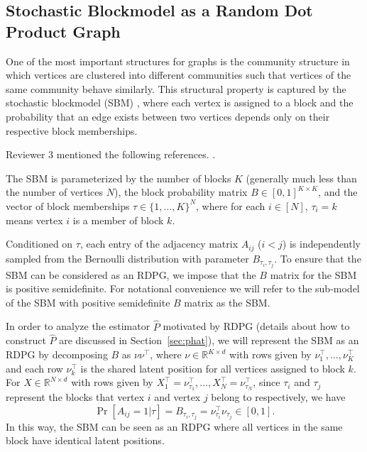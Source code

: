 \documentclass[10pt,letterpaper]{article}
\renewcommand{\Re}{\mathbb{R}}
\renewcommand{\hat}{\widehat}
\begin{document}
\subsection{Stochastic Blockmodel as a Random Dot Product Graph}
\label{section:sbm_rdpg}
One of the most important structures for graphs is the community structure in which vertices are clustered into different communities such that vertices of the same community behave similarly. This structural property is captured by the stochastic blockmodel (SBM) \citep{holland1983stochastic}, where each vertex is assigned to a block and the probability that an edge exists between two vertices depends only on their respective block memberships.

Reviewer 3 mentioned the following references. \cite{ambroise2012new, wolfe2013nonparametric, choi2012stochastic, picard2009deciphering, zanghi2008fast, zanghi2010clustering, pavlovic2014stochastic, daudin2008mixture}.


The SBM is parameterized by the number of blocks $K$ (generally much less than the number of vertices $N$), the block probability matrix $B \in [0,1]^{K \times K}$, and the vector of block memberships
$\tau\in\{1,\dotsc,K\}^N$, where for each $i \in [N]$, $\tau_i = k$ means vertex $i$ is a member of block $k$.

Conditioned on $\tau$, each entry of the adjacency matrix $A_{ij}$ ($i < j$) is independently sampled from the Bernoulli distribution with parameter $B_{\tau_i,\tau_j}$.
To ensure that the SBM can be considered as an RDPG, we impose that the $B$ matrix for the SBM is positive semidefinite. 
For notational convenience we will refer to the sub-model of the SBM with positive semidefinite $B$ matrix as the SBM.

In order to analyze the estimator $\hat{P}$ motivated by RDPG (details about how to construct $\hat{P}$ are discussed in Section~\ref{sec:phat}), we will represent the SBM as an RDPG by
decomposing $B$ as $\nu \nu^{\top}$, where $\nu \in \Re^{K \times d}$ with rows given by $\nu_1^{\top}, \dotsc, \nu_K^{\top}$ and each row $\nu_k^{\top}$ is the shared latent position for all vertices assigned to block $k$. 
For $X \in \Re^{N \times d}$ with rows given by $X_1^{\top} = \nu_{\tau_1}^{\top}, \dotsc, X_N^{\top} = \nu_{\tau_N}^{\top}$, since $\tau_i$ and $\tau_j$ represent the blocks that vertex $i$ and vertex $j$ belong to respectively, we have
\[
    \Pr[A_{ij} = 1|\tau] = B_{\tau_i, \tau_j} = \nu_{\tau_i}^{\top} \nu_{\tau_j}^{\phantom{\top}} \in [0, 1].
\]
In this way, the SBM can be seen as an RDPG where all vertices in the same block have identical latent positions.
\end{document}
